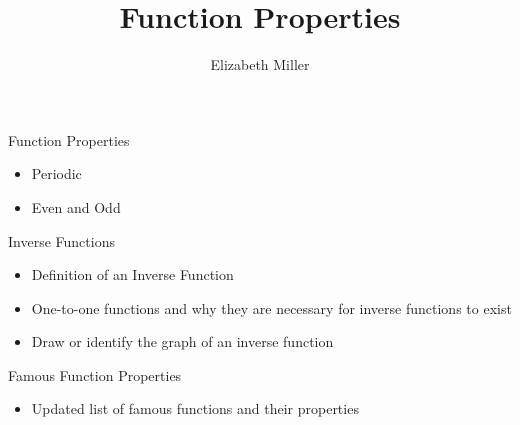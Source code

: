\documentclass{ximera}
\author{Elizabeth Miller}
\title{Function Properties}
\begin{document}
\begin{abstract}
\end{abstract}
\maketitle


\begin{objectives}

\item Function Properties
\begin{itemize}
	\item Periodic
	\item Even and Odd
\end{itemize}
\item Inverse Functions
\begin{itemize}
	\item Definition of an Inverse Function
	\item One-to-one functions and why they are necessary for inverse functions to exist
	\item Draw or identify the graph of an inverse function
\end{itemize}
\item Famous Function Properties
\begin{itemize}
	\item Updated list of famous functions and their properties
\end{itemize}


\end{objectives}
\end{document}
